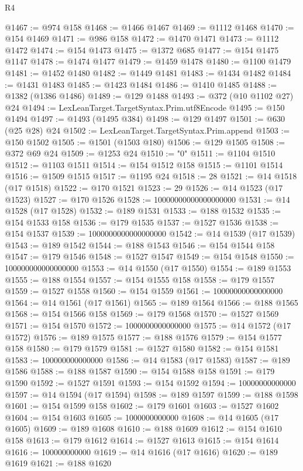 \begin{lexlean}{R4}
\begin{coremodule}
@1467 := @974 @158
@1468 := @1466 @1467
@1469 := @1112 @1468
@1470 := @154 @1469
@1471 := @986 @158
@1472 := @1470 @1471
@1473 := @1112 @1472
@1474 := @154 @1473
@1475 := @1372 @685
@1477 := @154 @1475 @1147
@1478 := @1474 @1477
@1479 := @1459 @1478
@1480 := @1100 @1479
@1481 := @1452 @1480
@1482 := @1449 @1481
@1483 := @1434 @1482
@1484 := @1431 @1483
@1485 := @1423 @1484
@1486 := @1410 @1485
@1488 := @1382 (@1386 @1486)
@1489 := @129 @1488
@1493 := @372 (@10 @1102 @27) @24
@1494 := LexLeanTarget.TargetSyntax.Prim.utf8Encode
@1495 := @150 @1494
@1497 := @1493 (@1495 @384)
@1498 := @129 @1497
@1501 := @630 (@25 @28) @24
@1502 := LexLeanTarget.TargetSyntax.Prim.append
@1503 := @150 @1502
@1505 := @1501 (@1503 @180)
@1506 := @129 @1505
@1508 := @372 @69 @24
@1509 := @1253 @24
@1510 := "0"
@1511 := @1104 @1510
@1512 := @1103 @1511
@1514 := @154 @1512 @158
@1515 := @1101 @1514
@1516 := @1509 @1515
@1517 := @1195 @24
@1518 := 28
@1521 := @14 @1518 (@17 @1518)
@1522 := @170 @1521
@1523 := 29
@1526 := @14 @1523 (@17 @1523)
@1527 := @170 @1526
@1528 := 10000000000000000000
@1531 := @14 @1528 (@17 @1528)
@1532 := @189 @1531
@1533 := @188 @1532
@1535 := @154 @1533 @158
@1536 := @179 @1535
@1537 := @1527 @1536
@1538 := @154 @1537
@1539 := 1000000000000000000
@1542 := @14 @1539 (@17 @1539)
@1543 := @189 @1542
@1544 := @188 @1543
@1546 := @154 @1544 @158
@1547 := @179 @1546
@1548 := @1527 @1547
@1549 := @154 @1548
@1550 := 100000000000000000
@1553 := @14 @1550 (@17 @1550)
@1554 := @189 @1553
@1555 := @188 @1554
@1557 := @154 @1555 @158
@1558 := @179 @1557
@1559 := @1527 @1558
@1560 := @154 @1559
@1561 := 10000000000000000
@1564 := @14 @1561 (@17 @1561)
@1565 := @189 @1564
@1566 := @188 @1565
@1568 := @154 @1566 @158
@1569 := @179 @1568
@1570 := @1527 @1569
@1571 := @154 @1570
@1572 := 1000000000000000
@1575 := @14 @1572 (@17 @1572)
@1576 := @189 @1575
@1577 := @188 @1576
@1579 := @154 @1577 @158
@1580 := @179 @1579
@1581 := @1527 @1580
@1582 := @154 @1581
@1583 := 100000000000000
@1586 := @14 @1583 (@17 @1583)
@1587 := @189 @1586
@1588 := @188 @1587
@1590 := @154 @1588 @158
@1591 := @179 @1590
@1592 := @1527 @1591
@1593 := @154 @1592
@1594 := 10000000000000
@1597 := @14 @1594 (@17 @1594)
@1598 := @189 @1597
@1599 := @188 @1598
@1601 := @154 @1599 @158
@1602 := @179 @1601
@1603 := @1527 @1602
@1604 := @154 @1603
@1605 := 1000000000000
@1608 := @14 @1605 (@17 @1605)
@1609 := @189 @1608
@1610 := @188 @1609
@1612 := @154 @1610 @158
@1613 := @179 @1612
@1614 := @1527 @1613
@1615 := @154 @1614
@1616 := 100000000000
@1619 := @14 @1616 (@17 @1616)
@1620 := @189 @1619
@1621 := @188 @1620

\end{coremodule}
\end{lexlean}
